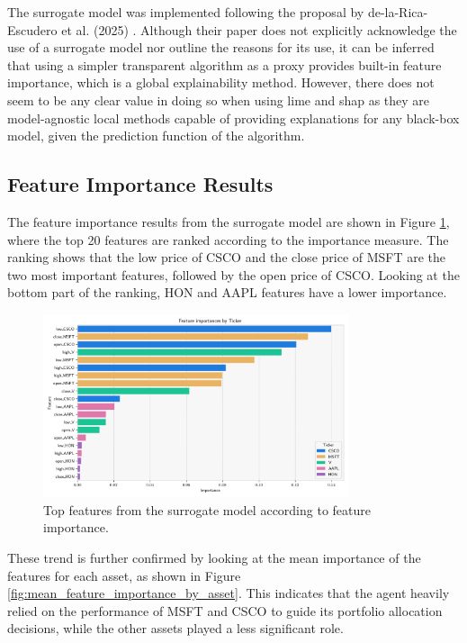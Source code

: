 The surrogate model was implemented following the proposal by de-la-Rica-Escudero et al. (2025) \cite{de-La-Rica-Escudero2025}. Although their paper does not explicitly acknowledge the use of a surrogate model nor outline the reasons for its use, it can be inferred that using a simpler transparent algorithm as a proxy provides built-in feature importance, which is a global explainability method. However, there does not seem to be any clear value in doing so when using \acrshort{lime} and \acrshort{shap} as they are model-agnostic local methods capable of providing explanations for any black-box model, given the prediction function of the algorithm. 

\subsection{Feature Importance Results} \label{sec:feature-importance-results}

The feature importance results from the surrogate model are shown in Figure \ref{fig:feature_importance_top_features}, where the top 20 features are ranked according to the importance measure. The ranking shows that the low price of CSCO and the close price of MSFT are the two most important features, followed by the open price of CSCO. Looking at the bottom part of the ranking, HON and AAPL features have a lower importance. 

\begin{figure}
    \centering
    \includegraphics[width=0.8\textwidth]{figures/feature_importance_top_features.png}
    \caption{Top features from the surrogate model according to feature importance.}
    \label{fig:feature_importance_top_features}
\end{figure}

These trend is further confirmed by looking at the mean importance of the features for each asset, as shown in Figure \ref{fig:mean_feature_importance_by_asset}. This indicates that the agent heavily relied on the performance of MSFT and CSCO to guide its portfolio allocation decisions, while the other assets played a less significant role. 

